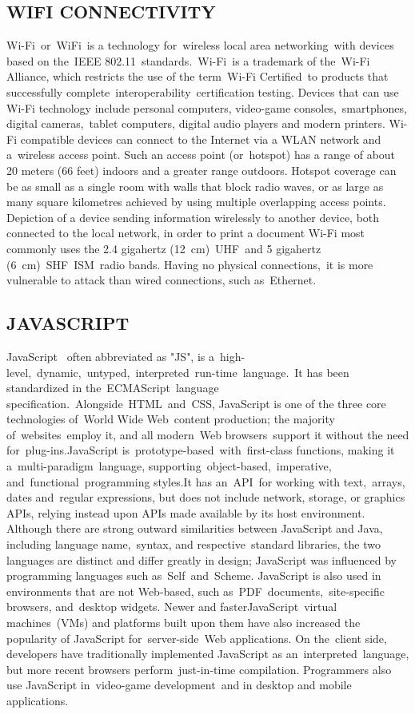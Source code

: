 \documentclass[11pt]{report} %
\begin{document}
\subsection{WIFI CONNECTIVITY}
\label{subsec:WIFI CONNECTIVITY}
Wi-Fi or WiFi is a technology for wireless local area networking with devices based on the IEEE 802.11 standards. Wi-Fi is a trademark of the Wi-Fi Alliance, which restricts the use of the term Wi-Fi Certified to products that successfully complete interoperability certification testing.
Devices that can use Wi-Fi technology include personal computers, video-game consoles, smartphones, digital cameras, tablet computers, digital audio players and modern printers. Wi-Fi compatible devices can connect to the Internet via a WLAN network and a wireless access point. Such an access point (or hotspot) has a range of about 20 meters (66 feet) indoors and a greater range outdoors. Hotspot coverage can be as small as a single room with walls that block radio waves, or as large as many square kilometres achieved by using multiple overlapping access points.
Depiction of a device sending information wirelessly to another device, both connected to the local network, in order to print a document
Wi-Fi most commonly uses the 2.4 gigahertz (12 cm) UHF and 5 gigahertz (6 cm) SHF ISM radio bands. Having no physical connections, it is more vulnerable to attack than wired connections, such as Ethernet.

\subsection{JAVASCRIPT}
\label{subsec:JAVASCRIPT}
JavaScript  often abbreviated as "JS", is a high-level, dynamic, untyped, interpreted run-time language. It has been standardized in the ECMAScript language specification. Alongside HTML and CSS, JavaScript is one of the three core technologies of World Wide Web content production; the majority of websites employ it, and all modern Web browsers support it without the need for plug-ins.JavaScript is prototype-based with first-class functions, making it a multi-paradigm language, supporting object-based, imperative, and functional programming styles.It has an API for working with text, arrays, dates and regular expressions, but does not include network, storage, or graphics APIs, relying instead upon APIs made available by its host environment.
Although there are strong outward similarities between JavaScript and Java, including language name, syntax, and respective standard libraries, the two languages are distinct and differ greatly in design; JavaScript was influenced by programming languages such as Self and Scheme.
JavaScript is also used in environments that are not Web-based, such as PDF documents, site-specific browsers, and desktop widgets. Newer and fasterJavaScript virtual machines (VMs) and platforms built upon them have also increased the popularity of JavaScript for server-side Web applications. On the client side, developers have traditionally implemented JavaScript as an interpreted language, but more recent browsers perform just-in-time compilation. Programmers also use JavaScript in video-game development and in desktop and mobile applications.
\end{document}

